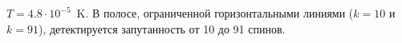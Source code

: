 $T=4.8\cdot10^{-5}$~K.
В полосе, ограниченной горизонтальными линиями ($k=10$ и $k=91$),
детектируется запутанность от 10 до 91 спинов.